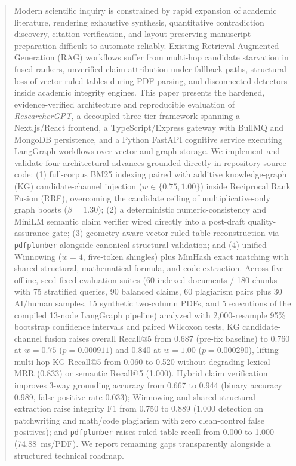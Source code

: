 \documentclass[conference]{IEEEtran}
\begin{document}
\begin{abstract}
Modern scientific inquiry is constrained by rapid expansion of academic literature, rendering exhaustive synthesis, quantitative contradiction discovery, citation verification, and layout-preserving manuscript preparation difficult to automate reliably. Existing Retrieval-Augmented Generation (RAG) workflows suffer from multi-hop candidate starvation in fused rankers, unverified claim attribution under fallback paths, structural loss of vector-ruled tables during PDF parsing, and disconnected detectors inside academic integrity engines. This paper presents the hardened, evidence-verified architecture and reproducible evaluation of \emph{ResearcherGPT}, a decoupled three-tier framework spanning a Next.js/React frontend, a TypeScript/Express gateway with BullMQ and MongoDB persistence, and a Python FastAPI cognitive service executing LangGraph workflows over vector and graph storage. We implement and validate four architectural advances grounded directly in repository source code: (1) full-corpus BM25 indexing paired with additive knowledge-graph (KG) candidate-channel injection ($w \in \{0.75, 1.00\}$) inside Reciprocal Rank Fusion (RRF), overcoming the candidate ceiling of multiplicative-only graph boosts ($\beta = 1.30$); (2) a deterministic numeric-consistency and MiniLM semantic claim verifier wired directly into a post-draft quality-assurance gate; (3) geometry-aware vector-ruled table reconstruction via \texttt{pdfplumber} alongside canonical structural validation; and (4) unified Winnowing ($w{=}4$, five-token shingles) plus MinHash exact matching with shared structural, mathematical formula, and code extraction. Across five offline, seed-fixed evaluation suites (60 indexed documents / 180 chunks with 75 stratified queries, 90 balanced claims, 60 plagiarism pairs plus 30 AI/human samples, 15 synthetic two-column PDFs, and 5 executions of the compiled 13-node LangGraph pipeline) analyzed with 2,000-resample 95\% bootstrap confidence intervals and paired Wilcoxon tests, KG candidate-channel fusion raises overall Recall@5 from 0.687 (pre-fix baseline) to 0.760 at $w{=}0.75$ ($p{=}0.000911$) and 0.840 at $w{=}1.00$ ($p{=}0.000290$), lifting multi-hop KG Recall@5 from 0.060 to 0.520 without degrading lexical MRR (0.833) or semantic Recall@5 (1.000). Hybrid claim verification improves 3-way grounding accuracy from 0.667 to 0.944 (binary accuracy 0.989, false positive rate 0.033); Winnowing and shared structural extraction raise integrity F1 from 0.750 to 0.889 (1.000 detection on patchwriting and math/code plagiarism with zero clean-control false positives); and \texttt{pdfplumber} raises ruled-table recall from 0.000 to 1.000 (74.88~ms/PDF). We report remaining gaps transparently alongside a structured technical roadmap.
\end{abstract}
\end{document}
